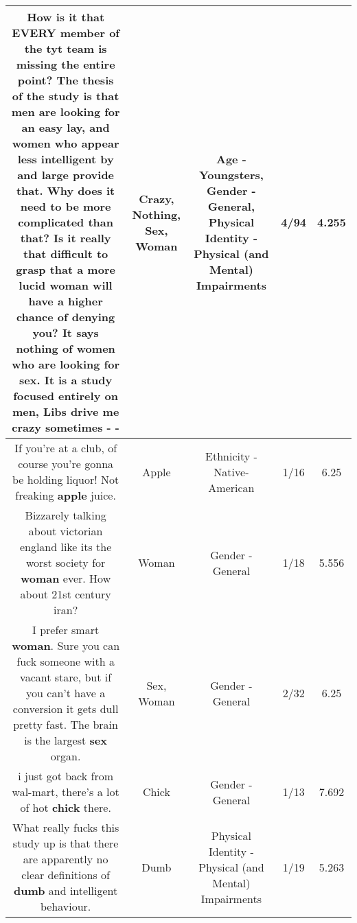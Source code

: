 \documentclass[11pt]{article}
\newlength\mylength
\begin{document}
\begin{center}
\begin{longtable}{|C{.65\mylength}|C{.30\mylength}|C{.12\mylength}|C{.12\mylength}|C{.12\mylength}|}
  \small How is it that EVERY member of the tyt team is missing the entire point? The thesis of the study is that men are looking for an easy lay, and women who appear less intelligent by and large provide that. Why does it need to be more complicated than that? Is it really that difficult to grasp that a more lucid \textbf{woman} will have a higher chance of denying you? It says \textbf{nothing} of women who are looking for \textbf{sex}. It is a study focused entirely on men, Libs drive me \textbf{crazy} sometimes - -\normalsize   & Crazy, Nothing, Sex, Woman & Age - Youngsters, Gender - General, Physical Identity - Physical (and Mental) Impairments & 4/94 & 4.255 \\  \hline
  \small If you're at a club, of course you're gonna be holding liquor! Not freaking \textbf{apple} juice.\normalsize   & Apple & Ethnicity - Native-American & 1/16 & 6.25 \\  \hline
  \small Bizzarely talking about victorian england like its the worst society for \textbf{woman} ever. How about 21st century iran?\normalsize   & Woman & Gender - General & 1/18 & 5.556 \\  \hline
  \small I prefer smart \textbf{woman}. Sure you can fuck someone with a vacant stare, but if you can't have a conversion it gets dull pretty fast. The brain is the largest \textbf{sex} organ.\normalsize   & Sex, Woman & Gender - General & 2/32 & 6.25 \\  \hline
  \small i just got back from wal-mart, there's a lot of hot \textbf{chick} there.\normalsize   & Chick & Gender - General & 1/13 & 7.692 \\  \hline
  \small What really fucks this study up is that there are apparently no clear definitions of \textbf{dumb} and intelligent behaviour.\normalsize   & Dumb & Physical Identity - Physical (and Mental) Impairments & 1/19 & 5.263 \\  \hline

\end{longtable}
\end{center}
\end{document}

